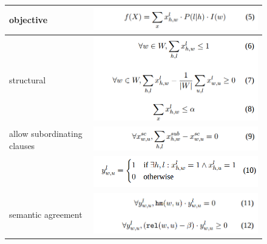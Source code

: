 \documentclass[xcolor={table}]{beamer}
\begin{document}
\begin{frame}[t]{\cite{filippova2008sentence}}
      \begin{figure}[h]
          \centering
          \begin{tabular}{l l}
              objective & \includegraphics[scale=.25]{images/obj-filippova08.png} \\
              \hline
              structural  &  \includegraphics[scale=.25]{images/struct-filippova08.png} \\
              \hline
              allow subordinating clauses &    \includegraphics[scale=.25]{images/syn-filippova08.png} \\
              \hline
                                          & \includegraphics[scale=.23]{images/con-filippova08.png} \\
              semantic agreement &    \includegraphics[scale=.23]{images/con2-filippova08.png} \\

\end{tabular}
\end{figure}
\end{frame}
\end{document}
